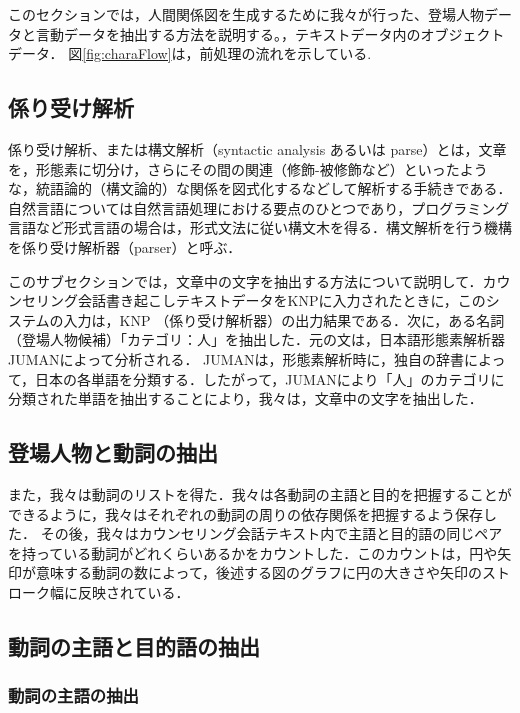 \documentclass[shuuron]{kuee}
\begin{document}
このセクションでは，人間関係図を生成するために我々が行った、登場人物データと言動データを抽出する方法を説明する。，テキストデータ内のオブジェクトデータ． 図\ref{fig:charaFlow}は，前処理の流れを示している.








\subsection{係り受け解析}


係り受け解析、または構文解析（syntactic analysis あるいは parse）とは，文章を，形態素に切分け，さらにその間の関連（修飾-被修飾など）といったような，統語論的（構文論的）な関係を図式化するなどして解析する手続きである．自然言語については自然言語処理における要点のひとつであり，プログラミング言語など形式言語の場合は，形式文法に従い構文木を得る．構文解析を行う機構を係り受け解析器（parser）と呼ぶ．

このサブセクションでは，文章中の文字を抽出する方法について説明して．カウンセリング会話書き起こしテキストデータをKNPに入力されたときに，このシステムの入力は，KNP \cite{KNP}（係り受け解析器）の出力結果である．次に，ある名詞（登場人物候補）「カテゴリ：人」を抽出した．元の文は，日本語形態素解析器JUMAN\cite{juman}によって分析される． JUMANは，形態素解析時に，独自の辞書によって，日本の各単語を分類する．したがって，JUMANにより「人」のカテゴリに分類された単語を抽出することにより，我々は，文章中の文字を抽出した．


\subsection{登場人物と動詞の抽出}

また，我々は動詞のリストを得た．我々は各動詞の主語と目的を把握することができるように，我々はそれぞれの動詞の周りの依存関係を把握するよう保存した．
その後，我々はカウンセリング会話テキスト内で主語と目的語の同じペアを持っている動詞がどれくらいあるかをカウントした．このカウントは，円や矢印が意味する動詞の数によって，後述する図のグラフに円の大きさや矢印のストローク幅に反映されている．

\subsection{動詞の主語と目的語の抽出}

\subsubsection{動詞の主語の抽出}
\end{document}
